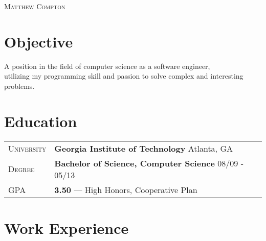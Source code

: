 \documentclass[a4paper, oneside, final]{scrartcl} %
\newcommand{\gray}{\rowcolor[gray]{.90}} %
\begin{document}
\begin{center} %


{\fontsize{36}{36}\selectfont\scshape Matthew Compton} %


\section{Objective}
A position in the field of computer science as a software engineer,\\
utilizing my programming skill and passion to solve complex and interesting problems.


\section{Education}

\begin{tabularx}{0.97\linewidth}{>{\raggedright\scshape}p{2cm} X}
\gray University & \textbf{Georgia Institute of Technology} \hfill Atlanta, GA\\
\gray Degree & \textbf{Bachelor of Science, Computer Science} \hfill 08/09 - 05/13\\
\gray GPA & \textbf{3.50} --- High Honors, Cooperative Plan\\
\end{tabularx}


\section{Work Experience}


\end{center}
\end{document}
